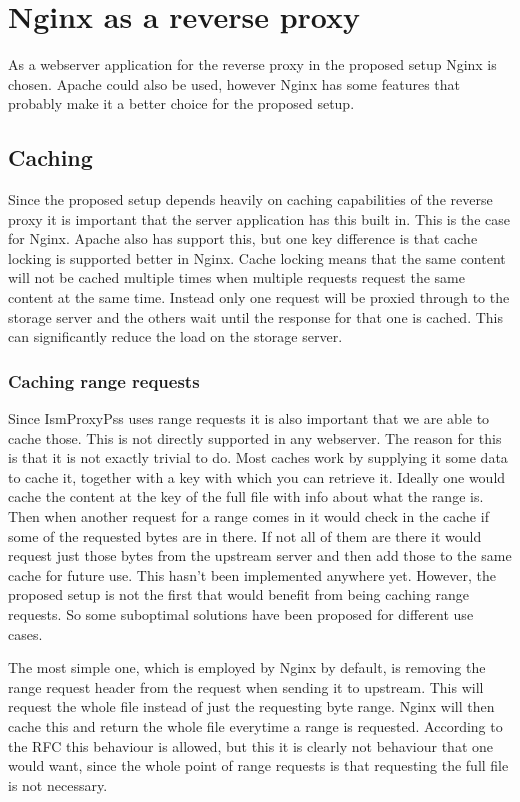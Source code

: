 \documentclass[twoside,openright]{uva-bachelor-thesis}
\begin{document}
\section{Nginx as a reverse proxy}
As a webserver application for the reverse proxy in the proposed setup Nginx is
chosen. Apache could also be used, however Nginx has some features that
probably make it a better choice for the proposed setup.

\subsection{Caching}
Since the proposed setup depends heavily on caching capabilities of the reverse
proxy it is important that the server application has this built in. This is the
case for Nginx. Apache also has support this, but one key difference is that
cache locking is supported better in Nginx. Cache locking means that the same
content will not be cached multiple times when multiple requests request the
same content at the same time. Instead only one request will be proxied through
to the storage server and the others wait until the response for that one is
cached. This can significantly reduce the load on the storage server.



\subsubsection{Caching range requests}
Since IsmProxyPss uses range requests it is also important that we are able to
cache those. This is not directly supported in any webserver. The reason for
this is that it is not exactly trivial to do. Most caches work by supplying it
some data to cache it, together with a key with which you can retrieve it.
Ideally one would cache the content at the key of the full file with info about
what the range is. Then when another request for a range comes in it would
check in the cache if some of the requested bytes are in there. If not all of
them are there it would request just those bytes from the upstream server and
then add those to the same cache for future use. This hasn't been implemented
anywhere yet. However, the proposed setup is not the first that would benefit
from being caching range requests. So some suboptimal solutions have been
proposed for different use cases.

The most simple one, which is employed by Nginx by default,
is removing the range request header from the request when sending it to
upstream. This will request the whole file instead of just the requesting byte
range. Nginx will then cache this and return the whole file everytime a range is
requested. According to the RFC this behaviour is allowed, but this it is
clearly not behaviour that one would want, since the whole point of range
requests is that requesting the full file is not necessary.
\end{document}
